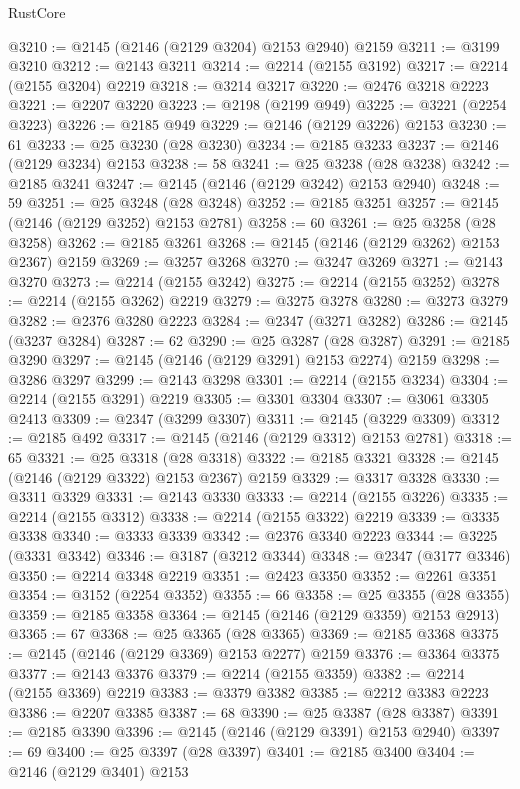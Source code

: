 \begin{lexlean}{RustCore}
\begin{coremodule}
@3210 := @2145 (@2146 (@2129 @3204) @2153 @2940) @2159
@3211 := @3199 @3210
@3212 := @2143 @3211
@3214 := @2214 (@2155 @3192)
@3217 := @2214 (@2155 @3204) @2219
@3218 := @3214 @3217
@3220 := @2476 @3218 @2223
@3221 := @2207 @3220
@3223 := @2198 (@2199 @949)
@3225 := @3221 (@2254 @3223)
@3226 := @2185 @949
@3229 := @2146 (@2129 @3226) @2153
@3230 := 61
@3233 := @25 @3230 (@28 @3230)
@3234 := @2185 @3233
@3237 := @2146 (@2129 @3234) @2153
@3238 := 58
@3241 := @25 @3238 (@28 @3238)
@3242 := @2185 @3241
@3247 := @2145 (@2146 (@2129 @3242) @2153 @2940)
@3248 := 59
@3251 := @25 @3248 (@28 @3248)
@3252 := @2185 @3251
@3257 := @2145 (@2146 (@2129 @3252) @2153 @2781)
@3258 := 60
@3261 := @25 @3258 (@28 @3258)
@3262 := @2185 @3261
@3268 := @2145 (@2146 (@2129 @3262) @2153 @2367) @2159
@3269 := @3257 @3268
@3270 := @3247 @3269
@3271 := @2143 @3270
@3273 := @2214 (@2155 @3242)
@3275 := @2214 (@2155 @3252)
@3278 := @2214 (@2155 @3262) @2219
@3279 := @3275 @3278
@3280 := @3273 @3279
@3282 := @2376 @3280 @2223
@3284 := @2347 (@3271 @3282)
@3286 := @2145 (@3237 @3284)
@3287 := 62
@3290 := @25 @3287 (@28 @3287)
@3291 := @2185 @3290
@3297 := @2145 (@2146 (@2129 @3291) @2153 @2274) @2159
@3298 := @3286 @3297
@3299 := @2143 @3298
@3301 := @2214 (@2155 @3234)
@3304 := @2214 (@2155 @3291) @2219
@3305 := @3301 @3304
@3307 := @3061 @3305 @2413
@3309 := @2347 (@3299 @3307)
@3311 := @2145 (@3229 @3309)
@3312 := @2185 @492
@3317 := @2145 (@2146 (@2129 @3312) @2153 @2781)
@3318 := 65
@3321 := @25 @3318 (@28 @3318)
@3322 := @2185 @3321
@3328 := @2145 (@2146 (@2129 @3322) @2153 @2367) @2159
@3329 := @3317 @3328
@3330 := @3311 @3329
@3331 := @2143 @3330
@3333 := @2214 (@2155 @3226)
@3335 := @2214 (@2155 @3312)
@3338 := @2214 (@2155 @3322) @2219
@3339 := @3335 @3338
@3340 := @3333 @3339
@3342 := @2376 @3340 @2223
@3344 := @3225 (@3331 @3342)
@3346 := @3187 (@3212 @3344)
@3348 := @2347 (@3177 @3346)
@3350 := @2214 @3348 @2219
@3351 := @2423 @3350
@3352 := @2261 @3351
@3354 := @3152 (@2254 @3352)
@3355 := 66
@3358 := @25 @3355 (@28 @3355)
@3359 := @2185 @3358
@3364 := @2145 (@2146 (@2129 @3359) @2153 @2913)
@3365 := 67
@3368 := @25 @3365 (@28 @3365)
@3369 := @2185 @3368
@3375 := @2145 (@2146 (@2129 @3369) @2153 @2277) @2159
@3376 := @3364 @3375
@3377 := @2143 @3376
@3379 := @2214 (@2155 @3359)
@3382 := @2214 (@2155 @3369) @2219
@3383 := @3379 @3382
@3385 := @2212 @3383 @2223
@3386 := @2207 @3385
@3387 := 68
@3390 := @25 @3387 (@28 @3387)
@3391 := @2185 @3390
@3396 := @2145 (@2146 (@2129 @3391) @2153 @2940)
@3397 := 69
@3400 := @25 @3397 (@28 @3397)
@3401 := @2185 @3400
@3404 := @2146 (@2129 @3401) @2153

\end{coremodule}
\end{lexlean}
